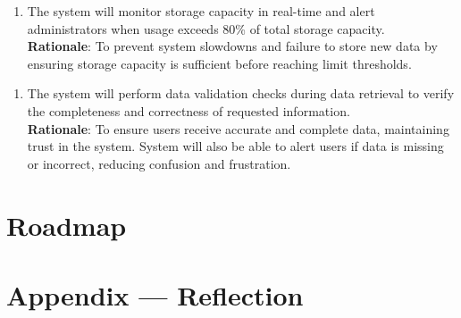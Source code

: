 \documentclass{article}
\begin{document}
\begin{enumerate}[{IR}Zay2. ]
    \item The system will monitor storage capacity in real-time and alert administrators when usage exceeds 80\% of total storage capacity.\\
    \textbf{Rationale}:  To prevent system slowdowns and failure to store new data by ensuring storage capacity is sufficient before reaching limit thresholds.
\end{enumerate} 
\begin{enumerate}[{IR}Zay3. ]
    \item The system will perform data validation checks during data retrieval to verify the completeness and correctness of requested information.\\
    \textbf{Rationale}:  To ensure users receive accurate and complete data, maintaining trust in the system. System will also be able to alert users if data is missing or incorrect, reducing confusion and frustration.
\end{enumerate} 



\section{Roadmap}


\newpage{}

\section*{Appendix --- Reflection}
\end{document}
